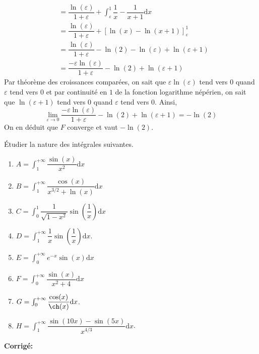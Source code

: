 \documentclass[a4paper,twoside,french,10pt]{VcCours}
\newcommand{\dx}{\text{d}x}
\newcommand{\corr}{\textbf{Corrigé:}}
\begin{document}
\begin{enumerate}
\begin{align*}
& = \dfrac{\ln(\varepsilon)}{1+\varepsilon} +\int_{\varepsilon}^1 \dfrac{1}{x}- \dfrac{1}{x+1} \dx \\
& = \dfrac{\ln(\varepsilon)}{1+\varepsilon} + \left[\ln(x)- \ln(x+1)\right]_{\varepsilon}^1 \\
& = \dfrac{\ln(\varepsilon)}{1+\varepsilon} - \ln(2) - \ln(\varepsilon)+ \ln(\varepsilon+1) \\
& = \dfrac{-\varepsilon \ln(\varepsilon)}{1+ \varepsilon} - \ln(2) + \ln(\varepsilon+1)
\end{align*}
Par théorème des croissances comparées, on sait que $\varepsilon \ln(\varepsilon)$ tend vers $0$ quand $\varepsilon$ tend vers $0$ et par continuité en $1$ de la fonction logarithme népérien, on sait que $\ln(\varepsilon+1)$ tend vers $0$ quand $\varepsilon$ tend vers $0$. Ainsi,
$$ \lim_{\varepsilon \rightarrow 0} \dfrac{-\varepsilon \ln(\varepsilon)}{1+ \varepsilon} - \ln(2) + \ln(\varepsilon+1) = - \ln(2)$$
On en déduit que $F$ converge et vaut $- \ln(2)$.
\end{enumerate}

\begin{Exercice}{} Étudier la nature des intégrales suivantes. 

\begin{multicols}{2}
\begin{enumerate}
\item $A = \int_1^{+ \infty} \dfrac{\sin(x)}{x^2} \dx$
\item $B = \int_1^{+ \infty} \dfrac{\cos(x)}{x^{3/2}+\ln(x)} \dx$
\item $C = \int_0^{1} \dfrac{1}{\sqrt{1-x^2}} \sin \left(\dfrac{1}{x}\right) \dx$
\item $D= \int_1^{+ \infty} \dfrac{1}{x} \sin \left(\dfrac{1}{x}\right) \dx$.
\item $E= \int_{0}^{+ \infty} e^{-x} \sin(x) \dx$
\item $F= \int_0^{+\infty} \dfrac{\sin(x)}{x^2+4} \dx$
\item $G= \int_0^{+ \infty} \dfrac{\cos(x)}{\ch(x)} \dx$.
\item $H= \int_1^{+\infty} \dfrac{\sin(10x)-\sin(5x)}{x^{4/3}} \dx$.
\end{enumerate}
\end{multicols}
\vspace{0.1cm}
\end{Exercice}

\corr 
\end{document}
